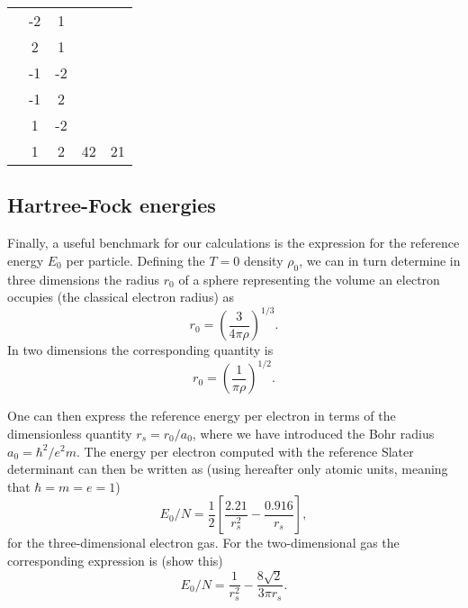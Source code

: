 \documentclass[graybox,sectrefs,envcountresetchap,open=right]{svmonodo}
\begin{document}
{\begin{tabular}{ccccc}
                      & -2      & 1       &                            &                          \\
                      & 2       & 1       &                            &                          \\
                      & -1      & -2      &                            &                          \\
                      & -1      & 2       &                            &                          \\
                      & 1       & -2      &                            &                          \\
                      & 1       & 2       & 42                         & 21                       \\
\hline
\end{tabular}

\vspace{4mm}

}


\noindent
\subsection{Hartree-Fock energies}

Finally, a useful benchmark for our calculations is the expression for
the reference energy $E_0$ per particle.
Defining the $T=0$ density $\rho_0$, we can in turn determine in three
dimensions the radius $r_0$ of a sphere representing the volume an
electron occupies (the classical electron radius) as
\[
r_0= \left(\frac{3}{4\pi \rho}\right)^{1/3}.
\]
In two dimensions the corresponding quantity is
\[
r_0= \left(\frac{1}{\pi \rho}\right)^{1/2}.
\]




One can then express the reference energy per electron in terms of the
dimensionless quantity $r_s=r_0/a_0$, where we have introduced the
Bohr radius $a_0=\hbar^2/e^2m$. The energy per electron computed with
the reference Slater determinant can then be written as
(using hereafter only atomic units, meaning that $\hbar = m = e = 1$)
\[
E_0/N=\frac{1}{2}\left[\frac{2.21}{r_s^2}-\frac{0.916}{r_s}\right],
\]
for the three-dimensional electron gas.  For the two-dimensional gas
the corresponding expression is (show this)
\[
E_0/N=\frac{1}{r_s^2}-\frac{8\sqrt{2}}{3\pi r_s}.
\]
\end{document}
